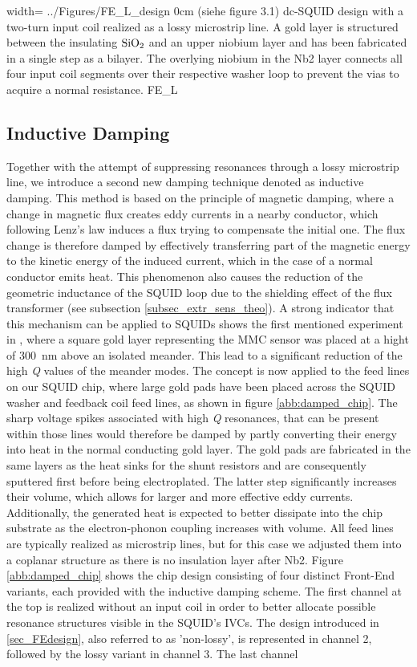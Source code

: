 {width=\textwidth}
{../Figures/FE_L_design}
{0cm}
{(siehe figure 3.1) dc-SQUID design with a two-turn input coil realized as a lossy microstrip line. A gold layer is structured between the insulating $\rm SiO_2$ and an upper niobium layer and has been fabricated in a single step as a bilayer. The overlying niobium in the Nb2 layer connects all four input coil segments over their respective washer loop to prevent the vias to acquire a normal resistance.} 
{FE_L}

\subsection{Inductive Damping} \label{subsec_ind_damp}

Together with the attempt of suppressing resonances through a lossy microstrip line, we introduce a second new damping technique denoted as inductive damping. This method is based on the principle of magnetic damping, where a change in magnetic flux creates eddy currents in a nearby conductor, which following Lenz's law induces a flux trying to compensate the initial one. The flux change is therefore damped by effectively transferring part of the magnetic energy to the kinetic energy of the induced current, which in the case of a normal conductor emits heat. This phenomenon also causes the reduction of the geometric inductance of the SQUID loop due to the shielding effect of the flux transformer (see subsection \ref{subsec_extr_sens_theo}). A strong indicator that this mechanism can be applied to SQUIDs shows the first mentioned experiment in \cite{Boyd2022}, where a square gold layer representing the MMC sensor was placed at a hight of \qty{300}{\nano\meter} above an isolated meander. This lead to a significant reduction of the high \textit{Q} values of the meander modes. The concept is now applied to the feed lines on our SQUID chip, where large gold pads have been placed across the SQUID washer and feedback coil feed lines, as shown in figure \ref{abb:damped_chip}. The sharp voltage spikes associated with high \textit{Q} resonances, that can be present within those lines would therefore be damped by partly converting their energy into heat in the normal conducting gold layer. The gold pads are fabricated in the same layers as the heat sinks for the shunt resistors and are consequently sputtered first before being electroplated. The latter step significantly increases their volume, which allows for larger and more effective eddy currents. Additionally, the generated heat is expected to better dissipate into the chip substrate as the electron-phonon coupling increases with volume. All feed lines are typically realized as microstrip lines, but for this case we adjusted them into a coplanar structure as there is no insulation layer after Nb2. Figure \ref{abb:damped_chip} shows the chip design consisting of four distinct Front-End variants, each provided with the inductive damping scheme. The first channel at the top is realized without an input coil in order to better allocate possible resonance structures visible in the SQUID's IVCs. The design introduced in \ref{sec_FEdesign}, also referred to as 'non-lossy', is represented in channel 2, followed by the lossy variant in channel 3. The last channel 